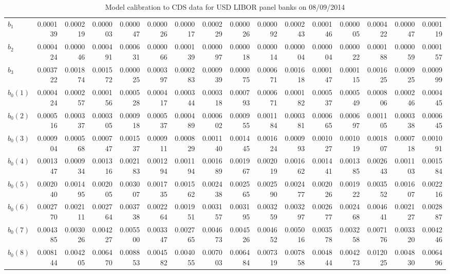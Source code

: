 \documentclass[12pt,a4paper]{article}
\theoremstyle{plain}
\numberwithin{equation}{section}
\begin{document}
\begin{table}[t]
\begin{subtable}{.5\textwidth}
{\begin{tabular}{|l|rrrrrrrrrrrrrr|r|}
   $\hat{b}_1$  & 0.000139 & 0.000219 & 0.000003 & 0.000047 & 0.000026 & 0.000017 & 0.000229 & 0.000026 & 0.000092 & 0.000243 & 0.000146 & 0.000005 & 0.000422 & 0.000047 & 0.000119 \\
    $\hat{b}_2$    & 0.000424 & 0.000046 & 0.000491 & 0.000631 & 0.000066 & 0.000139 & 0.000097 & 0.000018 & 0.000014 & 0.000004 & 0.000004 & 0.000022 & 0.000188 & 0.000059 & 0.000157 \\
    $\hat{b}_3$    & 0.003722 & 0.001874 & 0.001572 & 0.000025 & 0.000397 & 0.000283 & 0.000939 & 0.000075 & 0.000671 & 0.001618 & 0.000147 & 0.000115 & 0.001625 & 0.000925 & 0.000999 \\
     $\hat{b}_0(1)$  & 0.000424 & 0.000257 & 0.000156 & 0.000528 & 0.000417 & 0.000344 & 0.000318 & 0.000793 & 0.000671 & 0.000182 & 0.000537 & 0.000549 & 0.000806 & 0.000246 & 0.000445 \\
    $\hat{b}_0(2)$  & 0.000516 & 0.000337 & 0.000305 & 0.000918 & 0.000537 & 0.000489 & 0.000602 & 0.000955 & 0.001184 & 0.000381 & 0.000665 & 0.000697 & 0.001105 & 0.000338 & 0.000645 \\
     $\hat{b}_0(3)$   & 0.000904 & 0.000568 & 0.000747 & 0.001537 & 0.000911 & 0.000829 & 0.001140 & 0.001445 & 0.001624 & 0.000993 & 0.001027 & 0.001019 & 0.001807 & 0.000718 & 0.001091 \\
     $\hat{b}_0(4)$   & 0.001347 & 0.000934 & 0.001316 & 0.002183 & 0.001294 & 0.001194 & 0.001689 & 0.001967 & 0.002019 & 0.001662 & 0.001441 & 0.001385 & 0.002643 & 0.001103 & 0.001584 \\
    $\hat{b}_0(5)$   & 0.002040 & 0.001495 & 0.002005 & 0.003007 & 0.001735 & 0.001562 & 0.002438 & 0.002565 & 0.002590 & 0.002477 & 0.002026 & 0.001922 & 0.003552 & 0.001607 & 0.002216 \\
     $\hat{b}_0(6)$   & 0.002770 & 0.002111 & 0.002764 & 0.003738 & 0.002264 & 0.001951 & 0.003157 & 0.003195 & 0.003259 & 0.003297 & 0.002677 & 0.002468 & 0.004641 & 0.002127 & 0.002887 \\
     $\hat{b}_0(7)$   & 0.004385 & 0.003026 & 0.004227 & 0.005500 & 0.003347 & 0.002765 & 0.004673 & 0.004526 & 0.004652 & 0.005016 & 0.003578 & 0.003258 & 0.007176 & 0.003320 & 0.004246 \\
    $\hat{b}_0(8)$  & 0.008144 & 0.004205 & 0.006470 & 0.008853 & 0.004582 & 0.004055 & 0.007003 & 0.006484 & 0.007319 & 0.007858 & 0.004844 & 0.004273 & 0.012025 & 0.004830 & 0.006496 \\
    \bottomrule
    \end{tabular}%
    }
  \end{subtable}
   \caption{Model calibration to CDS data for USD LIBOR panel banks on 08/09/2014}\label{CDScoeffa}\vspace*{1ex}


\end{table}
\end{document}

